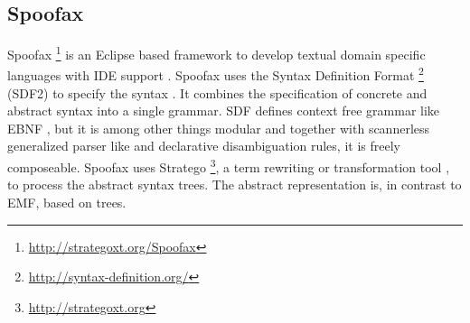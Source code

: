 \subsection{Spoofax}
Spoofax \footnote{\raggedright \url{http://strategoxt.org/Spoofax}} is an Eclipse based framework to develop textual domain specific languages with IDE support \cite{Spoofax}. Spoofax uses the Syntax Definition Format \footnote{\raggedright \url{http://syntax-definition.org/}} (SDF2) to specify the syntax \cite{Spoofax}. It combines the specification of concrete and abstract syntax into a single grammar. SDF defines context free grammar like EBNF \cite{sdf}, but it is among other things modular and together with scannerless generalized parser like \cite{sglr} and declarative disambiguation rules, it is freely composeable. Spoofax uses Stratego \footnote{\raggedright \url{http://strategoxt.org}}, a term rewriting or transformation tool \cite{stratego}, to process the abstract syntax trees. The abstract representation is, in contrast to EMF, based on trees.






